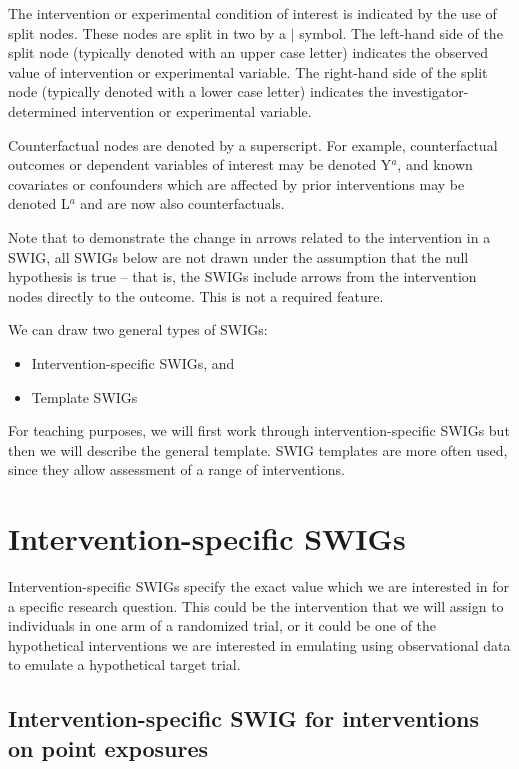 \documentclass[a4paper]{report}
\begin{document}
The intervention or experimental condition of interest is indicated by the use of split nodes. These nodes are split in two by a $|$ symbol. The left-hand side of the split node (typically denoted with an upper case letter) indicates the observed value of intervention or experimental variable. The right-hand side of the split node (typically denoted with a lower case letter) indicates the investigator-determined intervention or experimental variable. 

Counterfactual nodes are denoted by a superscript. For example, counterfactual outcomes or dependent variables of interest may be denoted Y$^a$, and known covariates or confounders which are affected by prior interventions may be denoted L$^a$ and are now also counterfactuals. 

Note that to demonstrate the change in arrows related to the intervention in a SWIG, all SWIGs below are not drawn under the assumption that the null hypothesis is true -- that is, the SWIGs include arrows from the intervention nodes directly to the outcome. This is not a required feature. 

We can draw two general types of SWIGs: 
\begin{itemize}
\item Intervention-specific SWIGs, and 
\item Template SWIGs 

\end{itemize}

For teaching purposes, we will first work through intervention-specific SWIGs but then we will describe the general template. SWIG templates are more often used, since they allow assessment of a range of interventions.

\newpage

\section{Intervention-specific SWIGs}

Intervention-specific SWIGs specify the exact value which we are interested in for a specific research question. This could be the intervention that we will assign to individuals in one arm of a randomized trial, or it could be one of the hypothetical interventions we are interested in emulating using observational data to emulate a hypothetical target trial.

\subsection{Intervention-specific SWIG for interventions on point exposures}
\end{document}
